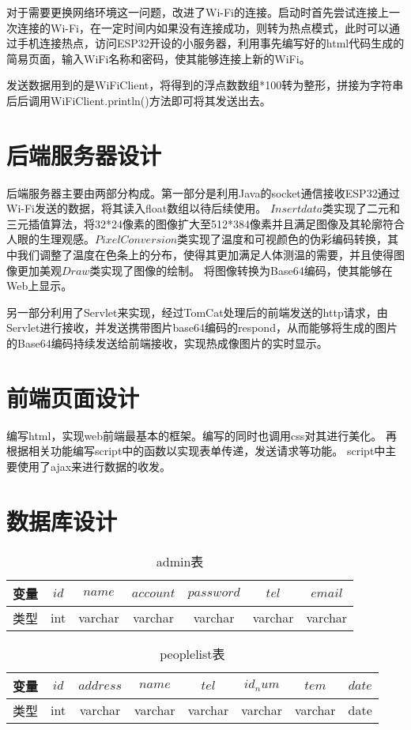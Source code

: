 对于需要更换网络环境这一问题，改进了Wi-Fi的连接。启动时首先尝试连接上一次连接的Wi-Fi，在一定时间内如果没有连接成功，则转为热点模式，此时可以通过手机连接热点，访问ESP32开设的小服务器，利用事先编写好的html代码生成的简易页面，输入WiFi名称和密码，使其能够连接上新的WiFi。

发送数据用到的是WiFiClient，将得到的浮点数数组*100转为整形，拼接为字符串后后调用WiFiClient.println()方法即可将其发送出去。
\section{后端服务器设计}
后端服务器主要由两部分构成。第一部分是利用Java的socket通信接收ESP32通过Wi-Fi发送的数据，将其读入float数组以待后续使用。
$Insertdata$类实现了二元和三元插值算法，将32*24像素的图像扩大至512*384像素并且满足图像及其轮廓符合人眼的生理观感。$PixelConversion$类实现了温度和可视颜色的伪彩编码转换，其中我们调整了温度在色条上的分布，使得其更加满足人体测温的需要，并且使得图像更加美观$Draw$类实现了图像的绘制。
将图像转换为Base64编码，使其能够在Web上显示。

另一部分利用了Servlet来实现，经过TomCat处理后的前端发送的http请求，由Servlet进行接收，并发送携带图片base64编码的respond，从而能够将生成的图片的Base64编码持续发送给前端接收，实现热成像图片的实时显示。
\section{前端页面设计}
编写html，实现web前端最基本的框架。编写的同时也调用css对其进行美化。
再根据相关功能编写script中的函数以实现表单传递，发送请求等功能。
script中主要使用了ajax来进行数据的收发。
\section{数据库设计}
\begin{table}[htbp]
    \caption{admin表}\label{tab:table1}
    \vspace{0.5em}\centering\wuhao
    \begin{tabular}{ccccccc}
    \toprule[1.5pt]
    变量 & $id$ & $name$ & $account$&$password$ &$tel$&$email$\\
    \midrule[1pt]
    类型& int & varchar & varchar&varchar&varchar&varchar\\
    \bottomrule[1.5pt]
    \end{tabular}
    \vspace{\baselineskip}
    \end{table}
    
    \begin{table}[htbp]
        \caption{peoplelist表}\label{tab:table2}
        \vspace{0.5em}\centering\wuhao
        \begin{tabular}{cccccccc}
        \toprule[1.5pt]
        变量 & $id$&$address$ & $name$ & $tel$&$id_num$ &$tem$&$date$\\
        \midrule[1pt]
        类型& int & varchar & varchar&varchar&varchar&varchar&date\\
        \bottomrule[1.5pt]
        \end{tabular}
        \vspace{\baselineskip}
        \end{table}